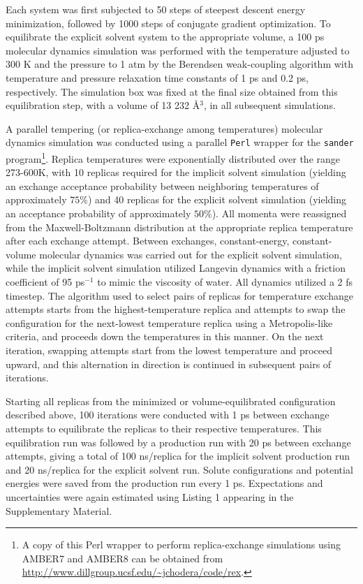 Each system was first subjected to 50 steps of steepest descent energy minimization, followed by 1000 steps of conjugate gradient optimization.  To equilibrate the explicit solvent system to the appropriate volume, a 100 ps molecular dynamics simulation was performed with the temperature adjusted to 300 K and the pressure to 1 atm by the Berendsen weak-coupling algorithm \cite{berendsen:1984a} with temperature and pressure relaxation time constants of 1 ps and 0.2 ps, respectively.  The simulation box was fixed at the final size obtained from this equilibration step, with a volume of 13 232 \AA$^3$, in all subsequent simulations.

A parallel tempering (or replica-exchange among temperatures) molecular dynamics simulation \cite{sugita:1999a} was conducted using a parallel {\tt Perl} wrapper for the {\tt sander} program\footnote{A copy of this Perl wrapper to perform replica-exchange simulations using AMBER7 and AMBER8 can be obtained from \url{http://www.dillgroup.ucsf.edu/~jchodera/code/rex}.}.  Replica temperatures were exponentially distributed over the range 273-600K, with 10 replicas required for the implicit solvent simulation (yielding an exchange acceptance probability between neighboring temperatures of approximately $75\%$) and 40 replicas for the explicit solvent simulation (yielding an acceptance probability of approximately $50\%$).  All momenta were reassigned from the Maxwell-Boltzmann distribution at the appropriate replica temperature after each exchange attempt. Between exchanges, constant-energy, constant-volume molecular dynamics was carried out for the explicit solvent simulation, while the implicit solvent simulation utilized Langevin dynamics with a friction coefficient of 95 ps$^{-1}$ to mimic the viscosity of water.  All dynamics utilized a 2 fs timestep.  The algorithm used to select pairs of replicas for temperature exchange attempts starts from the highest-temperature replica and attempts to swap the configuration for the next-lowest temperature replica using a Metropolis-like criteria, and proceeds down the temperatures in this manner.  On the next iteration, swapping attempts start from the lowest temperature and proceed upward, and this alternation in direction is continued in subsequent pairs of iterations.

Starting all replicas from the minimized or volume-equilibrated configuration described above, 100 iterations were conducted with 1 ps between exchange attempts to equilibrate the replicas to their respective temperatures.  This equilibration run was followed by a production run with 20 ps between exchange attempts, giving a total of 100 ns/replica for the implicit solvent production run and 20 ns/replica for the explicit solvent run.  Solute configurations and potential energies were saved from the production run every 1 ps.  Expectations and uncertainties were again estimated using Listing 1 appearing in the Supplementary Material.

